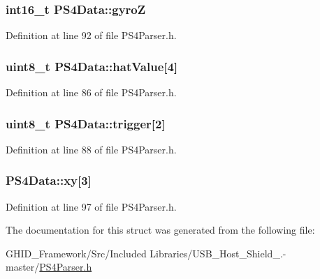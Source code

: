 \hypertarget{struct_p_s4_data_ace15cafba1570d56951e7db7947ba94c}{
\subsubsection[{gyro\-Z}]{\setlength{\rightskip}{0pt plus 5cm}int16\-\_\-t {\bf \-P\-S4\-Data\-::gyro\-Z}}}\label{struct_p_s4_data_ace15cafba1570d56951e7db7947ba94c}


\-Definition at line 92 of file \-P\-S4\-Parser.\-h.

\hypertarget{struct_p_s4_data_aa004cc456c79269dec99a9eed667484d}{
\subsubsection[{hat\-Value}]{\setlength{\rightskip}{0pt plus 5cm}uint8\-\_\-t {\bf \-P\-S4\-Data\-::hat\-Value}\mbox{[}4\mbox{]}}}\label{struct_p_s4_data_aa004cc456c79269dec99a9eed667484d}


\-Definition at line 86 of file \-P\-S4\-Parser.\-h.

\hypertarget{struct_p_s4_data_aad2133de0113cee402cda4a8c7e8b6a5}{
\subsubsection[{trigger}]{\setlength{\rightskip}{0pt plus 5cm}uint8\-\_\-t {\bf \-P\-S4\-Data\-::trigger}\mbox{[}2\mbox{]}}}\label{struct_p_s4_data_aad2133de0113cee402cda4a8c7e8b6a5}


\-Definition at line 88 of file \-P\-S4\-Parser.\-h.

\hypertarget{struct_p_s4_data_a1cfd90d32bbd9233dae34fb148fc9f56}{
\subsubsection[{xy}]{ {\bf \-P\-S4\-Data\-::xy}\mbox{[}3\mbox{]}}}\label{struct_p_s4_data_a1cfd90d32bbd9233dae34fb148fc9f56}


\-Definition at line 97 of file \-P\-S4\-Parser.\-h.



\-The documentation for this struct was generated from the following file\-:\begin{DoxyCompactItemize}
\item 
\-G\-H\-I\-D\-\_\-\-Framework/\-Src/\-Included Libraries/\-U\-S\-B\-\_\-\-Host\-\_\-\-Shield\-\_.-\/master/\hyperlink{_p_s4_parser_8h}{\-P\-S4\-Parser.\-h}\end{DoxyCompactItemize}
